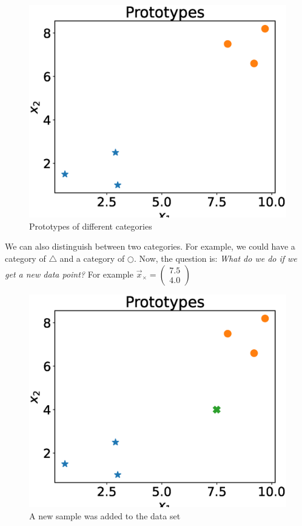 \begin{figure}[h]
  \centering
  \includegraphics[width=.75\textwidth]{images/prototypes_0.eps}
  \caption{Prototypes of different categories}
  \label{fig:prototypes_0}
\end{figure}

We can also distinguish between two categories. For example, we could have a category of $\bigtriangleup$ and a category of $\bigcirc$.
Now, the question is: \textit{What do we do if we get a new data point?} For example $\vec{x}_{\times} = \begin{pmatrix}7.5\\4.0\end{pmatrix}$

\begin{figure}[h]
  \centering
  \includegraphics[width=.75\textwidth]{images/prototypes_1.eps}
  \caption{A new sample was added to the data set}
  \label{fig:prototypes_1}
\end{figure}

